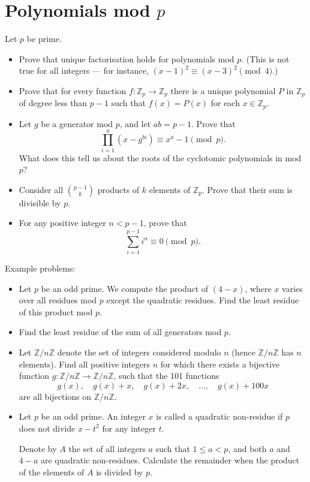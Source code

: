 \documentclass{article}
\newcommand\Zz{\mathbb{Z}}
\begin{document}
\section{Polynomials mod $p$}
Let $p$ be prime.
\begin{itemize}
	\item Prove that unique factorisation holds for polynomials mod $p$. (This is
	      not true for all integers --- for instance,
	      $(x-1)^2\equiv(x-3)^2\pmod 4$.)
	\item Prove that for every function $f:\Zz_p\to\Zz_p$ there is a unique polynomial $P$ in
	      $\Zz_p$ of degree less than $p-1$ such that $f(x)=P(x)$ for each
	      $x\in\Zz_p$.
	\item Let $g$ be a generator mod $p$, and let $ab=p-1$. Prove that
	      \[\prod_{i=1}^a (x-g^{bi})\equiv x^a-1\pmod p.\]
	      What does this tell us about the roots of the cyclotomic polynomials in mod
	      $p$?
	\item Consider all $\binom{p-1}k$ products of $k$ elements of $\Zz_p$. Prove
	      that their sum is divisible by $p$.
	\item For any positive integer $n<p-1$, prove that
	      \[\sum_{i=1}^{p-1} i^n\equiv 0\pmod p.\]
\end{itemize}
Example problems:
\begin{itemize}
	\item Let $p$ be an odd prime. We compute the product of $(4-x)$,
	      where $x$ varies over all residues mod $p$ except the quadratic residues.
	      Find the least residue of this product mod $p$.
	\item Find the least residue of the sum of all generators mod $p$.
	\item Let $\mathbb{Z}/n\mathbb{Z}$ denote the set of integers considered
	      modulo $n$ (hence $\mathbb{Z}/n\mathbb{Z}$ has $n$ elements). Find all
	      positive integers $n$ for which there exists a bijective function $g:
		      \mathbb{Z}/n\mathbb{Z} \to \mathbb{Z}/n\mathbb{Z}$, such that the 101
	      functions
	      \[g(x), \quad g(x) + x, \quad g(x) + 2x, \quad \dots, \quad g(x) + 100x\]are
	      all bijections on $\mathbb{Z}/n\mathbb{Z}$.
	\item Let $p$ be an odd prime. An integer $x$ is called a quadratic
	      non-residue if $p$ does not divide $x-t^2$ for any integer $t$.

	      Denote by $A$ the set of all integers $a$ such that $1\le a<p$, and both $a$
	      and $4-a$ are quadratic non-residues. Calculate the remainder when the
	      product of the elements of $A$ is divided by $p$.
\end{itemize}
\end{document}
